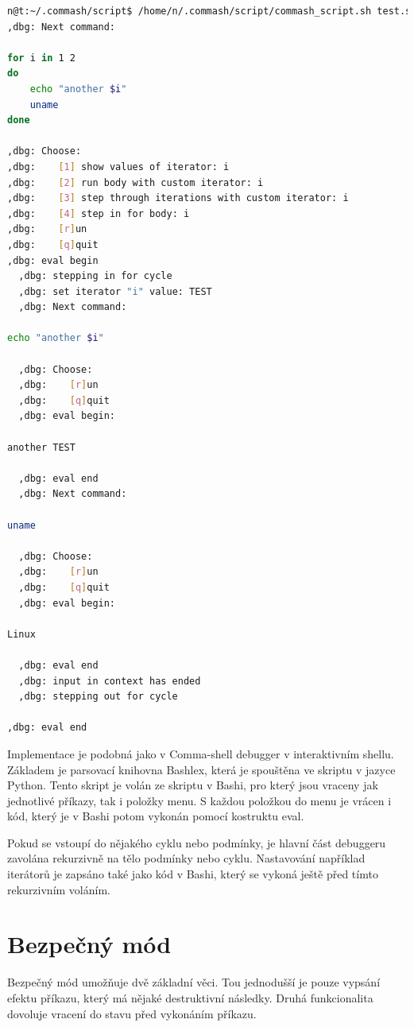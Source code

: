 \documentclass[thesis=M,czech]{FITthesis}[2012/06/26]
\begin{document}
\begin{minipage}{\linewidth}
\begin{lstlisting}[language=bash, caption={Debugger shell skriptu}, label={lst:dbgscript}]
n@t:~/.commash/script$ /home/n/.commash/script/commash_script.sh test.sh 
,dbg: Next command:

for i in 1 2
do
	echo "another $i"
	uname
done

,dbg: Choose:
,dbg:    [1] show values of iterator: i
,dbg:    [2] run body with custom iterator: i
,dbg:    [3] step through iterations with custom iterator: i
,dbg:    [4] step in for body: i
,dbg:    [r]un
,dbg:    [q]quit	
,dbg: eval begin
  ,dbg: stepping in for cycle
  ,dbg: set iterator "i" value: TEST
  ,dbg: Next command:

echo "another $i"

  ,dbg: Choose:
  ,dbg:    [r]un
  ,dbg:    [q]quit	
  ,dbg: eval begin:

another TEST

  ,dbg: eval end
  ,dbg: Next command:

uname

  ,dbg: Choose:
  ,dbg:    [r]un
  ,dbg:    [q]quit	
  ,dbg: eval begin:

Linux

  ,dbg: eval end
  ,dbg: input in context has ended
  ,dbg: stepping out for cycle

,dbg: eval end
\end{lstlisting}
\end{minipage}


Implementace je podobná jako v Comma-shell debugger v interaktivním shellu. Základem je parsovací knihovna Bashlex, která je spouštěna ve skriptu v jazyce Python. Tento skript je volán ze skriptu v Bashi, pro který jsou vraceny jak jednotlivé příkazy, tak i položky menu. S každou položkou do menu je vrácen i kód, který je v Bashi potom vykonán pomocí kostruktu eval.

Pokud se vstoupí do nějakého cyklu nebo podmínky, je hlavní část debuggeru zavolána rekurzivně na tělo podmínky nebo cyklu. Nastavování například iterátorů je zapsáno také jako kód v Bashi, který se vykoná ještě před tímto rekurzivním voláním.


%
%
%
%
%
\section{Bezpečný mód}

Bezpečný mód umožňuje dvě základní věci. Tou jednodušší je pouze vypsání efektu příkazu, který má nějaké destruktivní následky. Druhá funkcionalita dovoluje vracení do stavu před vykonáním příkazu.
\end{document}
